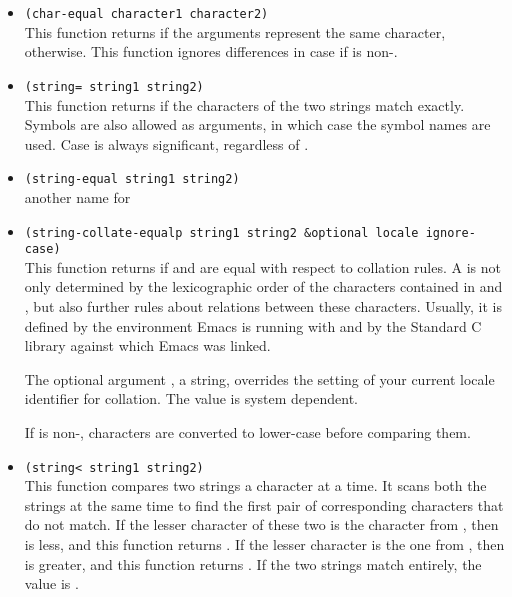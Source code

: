 \begin{itemize}[itemsep=10pt]
\item \lstinline|(char-equal character1 character2)|\\
  This function returns  if the arguments represent the same character,  otherwise.
  This function ignores differences in case if  is non-.
\item \lstinline|(string= string1 string2)|\\
  This function returns  if the characters of the two strings match exactly.
  Symbols are also allowed as arguments, in which case the symbol names are used.
  Case is always significant, regardless of .
\item \lstinline|(string-equal string1 string2)|\\
  another name for 
\item \lstinline|(string-collate-equalp string1 string2 &optional locale ignore-case)|\\
  This function returns  if  and  are equal with respect to collation rules.
  A  is not only determined by the lexicographic order of the characters contained in  and , but also further rules about relations between these characters.
  Usually, it is defined by the  environment Emacs is running with and by the Standard C library against which Emacs was linked.

  The optional argument , a string, overrides the setting of your current locale identifier for collation.
  The value is system dependent.

  If  is non-, characters are converted to lower-case before comparing them.

\item \lstinline|(string< string1 string2)|\\
  This function compares two strings a character at a time.
  It scans both the strings at the same time to find the first pair of corresponding characters that do not match.
  If the lesser character of these two is the character from , then  is less, and this function returns .
  If the lesser character is the one from , then  is greater, and this function returns .
  If the two strings match entirely, the value is .
  

\end{itemize}
